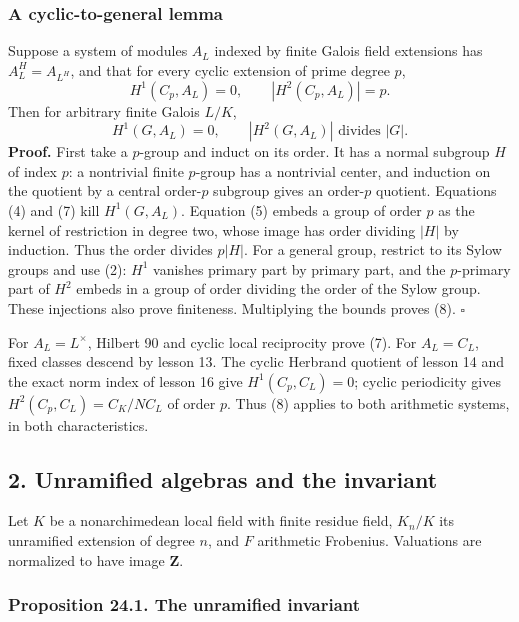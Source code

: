 \documentclass[11pt,a4paper]{article}
\begin{document}
\subsubsection{A cyclic-to-general
lemma}\label{a-cyclic-to-general-lemma}

Suppose a system of modules \(A_L\) indexed by finite Galois field
extensions has \(A_L^H=A_{L^H}\), and that for every cyclic extension of
prime degree \(p\), \[
H^1(C_p,A_L)=0,\qquad |H^2(C_p,A_L)|=p.
\tag{7}
\] Then for arbitrary finite Galois \(L/K\), \[
H^1(G,A_L)=0,\qquad |H^2(G,A_L)|\text{ divides }|G|.
\tag{8}
\] \textbf{Proof.} First take a \(p\)-group and induct on its order. It
has a normal subgroup \(H\) of index \(p\): a nontrivial finite
\(p\)-group has a nontrivial center, and induction on the quotient by a
central order-\(p\) subgroup gives an order-\(p\) quotient. Equations
(4) and (7) kill \(H^1(G,A_L)\). Equation (5) embeds a group of order
\(p\) as the kernel of restriction in degree two, whose image has order
dividing \(|H|\) by induction. Thus the order divides \(p|H|\). For a
general group, restrict to its Sylow groups and use (2): \(H^1\)
vanishes primary part by primary part, and the \(p\)-primary part of
\(H^2\) embeds in a group of order dividing the order of the Sylow
group. These injections also prove finiteness. Multiplying the bounds
proves (8). \(\square\)

For \(A_L=L^\times\), Hilbert 90 and cyclic local reciprocity prove (7).
For \(A_L=C_L\), fixed classes descend by lesson 13. The cyclic Herbrand
quotient of lesson 14 and the exact norm index of lesson 16 give
\(H^1(C_p,C_L)=0\); cyclic periodicity gives \(H^2(C_p,C_L)=C_K/NC_L\)
of order \(p\). Thus (8) applies to both arithmetic systems, in both
characteristics.

\subsection{2. Unramified algebras and the
invariant}\label{unramified-algebras-and-the-invariant}

Let \(K\) be a nonarchimedean local field with finite residue field,
\(K_n/K\) its unramified extension of degree \(n\), and \(F\) arithmetic
Frobenius. Valuations are normalized to have image \(\mathbf Z\).

\subsubsection{Proposition 24.1. The unramified
invariant}\label{proposition-24.1.-the-unramified-invariant}
\end{document}
